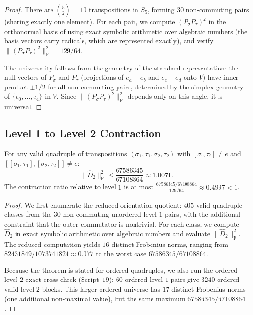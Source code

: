 \documentclass[version=final]{iacrcc}
\newcommand{\norm}[1]{\lVert #1 \rVert}
\newcommand{\frob}[1]{\norm{#1}_{\mathrm{F}}}
\newcommand{\Dhat}{\widehat{D}}
\begin{document}
\begin{proof}
There are $\binom{5}{2} = 10$ transpositions in $S_5$, forming $30$
non-commuting pairs (sharing exactly one element).
For each pair, we compute $(P_\sigma P_\tau)^2$ in the orthonormal basis of
 using exact symbolic arithmetic over algebraic numbers (the
basis vectors carry radicals, which are represented exactly), and verify
$\frob{(P_\sigma P_\tau)^2}^2 = 129/64$.

The universality follows from the geometry of the standard representation:
the null vectors of $P_\sigma$ and $P_\tau$ (projections of $e_a - e_b$ and
$e_c - e_d$ onto $V$) have inner product $\pm 1/2$ for all non-commuting pairs,
determined by the simplex geometry of $\{e_0, \ldots, e_4\}$ in $V$.
Since $\frob{(P_\sigma P_\tau)^2}^2$ depends only on this angle, it is
universal.
\end{proof}


\subsection{Level 1 to Level 2 Contraction}

\begin{theorem}
\label{thm:level12}
For any valid quadruple of transpositions $(\sigma_1, \tau_1, \sigma_2, \tau_2)$
with $[\sigma_i, \tau_i] \neq e$ and $[[\sigma_1,\tau_1], [\sigma_2,\tau_2]] \neq e$:
\[
\frob{\Dhat_2}^2 \leq \frac{67586345}{67108864} \approx 1.0071.
\]
The contraction ratio relative to level $1$ is at most
$\frac{67586345/67108864}{129/64} \approx 0.4997 < 1$.
\end{theorem}

\begin{proof}
We first enumerate the reduced orientation quotient: $405$ valid quadruple
classes from the $30$ non-commuting unordered level-$1$ pairs, with the
additional constraint that the outer commutator is nontrivial. For each class,
we compute $\Dhat_2$ in exact symbolic arithmetic over algebraic numbers and
evaluate $\frob{\Dhat_2}^2$. The reduced computation yields $16$ distinct Frobenius
norms, ranging from $82431849/1073741824 \approx 0.077$ to the worst case
$67586345/67108864$.

Because the theorem is stated for ordered quadruples, we also run the ordered
level-$2$ exact cross-check (Script~$19$): $60$ ordered level-$1$ pairs give
$3240$ ordered valid level-$2$ blocks. This larger ordered universe has $17$
distinct Frobenius norms (one additional non-maximal value), but the same
maximum $67586345/67108864$.
\end{proof}
\end{document}
